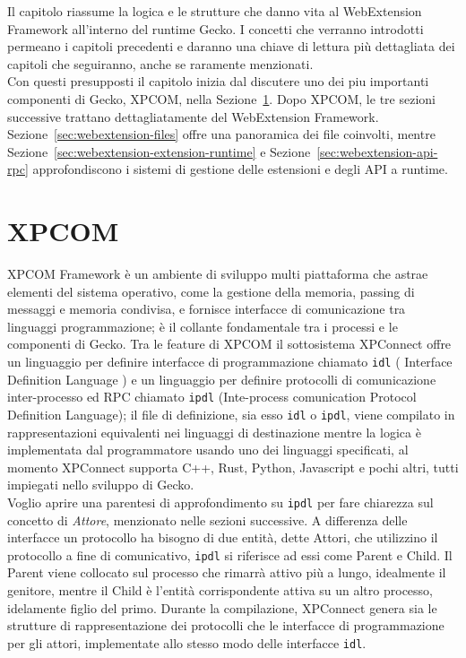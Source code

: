 \documentclass{sapthesis}
\newcommand{\code}[1]{\texttt{#1}}
\newcommand{\refSection}[1]{Sezione~\ref{#1}}
\newcommand{\idl}{\code{idl}}
\newcommand{\ipdl}{\code{ipdl}}
\begin{document}
    Il capitolo riassume la logica e le strutture che danno vita al WebExtension Framework all'interno
    del runtime Gecko. I concetti che verranno introdotti permeano i capitoli precedenti e daranno
    una chiave di lettura più dettagliata dei capitoli che seguiranno, anche se raramente menzionati.\\
    Con questi presupposti il capitolo inizia dal discutere uno dei piu importanti componenti di Gecko,
    XPCOM, nella \refSection{sec:xpcom}.
    Dopo XPCOM, le tre sezioni successive trattano dettagliatamente del WebExtension Framework.
    \refSection{sec:webextension-files} offre una panoramica dei file coinvolti, mentre \refSection{sec:webextension-extension-runtime}
    e \refSection{sec:webextension-api-rpc} approfondiscono i sistemi di gestione delle estensioni e
    degli API a runtime.

    \section{XPCOM}
    \label{sec:xpcom}
        XPCOM Framework è un ambiente di sviluppo multi piattaforma che astrae elementi del sistema operativo,
        come la gestione della memoria, passing di messaggi e memoria condivisa, e fornisce interfacce di 
        comunicazione tra linguaggi programmazione; è il collante fondamentale tra i processi e le componenti di
        Gecko. Tra le feature di XPCOM il sottosistema XPConnect offre un linguaggio per definire
        interfacce di programmazione chiamato \idl{} ( Interface Definition Language ) e un linguaggio per definire protocolli
        di comunicazione inter-processo ed RPC chiamato \ipdl{} (Inte-process comunication Protocol Definition Language);
        il file di definizione, sia esso \idl{} o \ipdl{}, viene compilato in rappresentazioni equivalenti nei linguaggi
        di destinazione mentre la logica è implementata dal programmatore usando uno dei linguaggi specificati,
        al momento XPConnect supporta C++, Rust, Python, Javascript e pochi altri, tutti impiegati nello sviluppo
        di Gecko.\\
        Voglio aprire una parentesi di approfondimento su \ipdl{} per fare chiarezza sul concetto di \textit{Attore}, 
        menzionato nelle sezioni successive. A differenza delle interfacce un protocollo ha bisogno di due entità,
        dette Attori, che utilizzino il protocollo a fine di comunicativo, \ipdl{} si riferisce ad essi come 
        Parent e Child. Il Parent viene collocato sul processo che rimarrà attivo più a lungo, idealmente il genitore, 
        mentre il Child è l'entità corrispondente attiva su un altro processo, idelamente figlio del primo.
        Durante la compilazione, XPConnect genera sia le strutture di rappresentazione dei protocolli che le
        interfacce di programmazione per gli attori, implementate allo stesso modo delle interfacce \idl{}.
\end{document}
